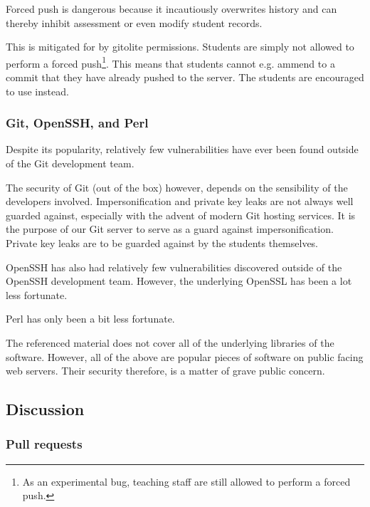 Forced push is dangerous because it incautiously overwrites history and can
thereby inhibit assessment or even modify student records.

This is mitigated for by gitolite permissions. Students are simply not allowed
to perform a forced push\footnote{As an experimental bug, teaching staff are
still allowed to perform a forced push.}. This means that students cannot e.g.
ammend to a commit that they have already pushed to the server. The students
are encouraged to use \cite{man-1-git-revert} instead.

\subsubsection{Git, OpenSSH, and Perl}

Despite its popularity, relatively few vulnerabilities have ever been found
outside of the Git development team\cite{cvedetails-com-2014a}.

The security of Git (out of the box) however, depends on the sensibility of the
developers involved. Impersonification and private key leaks are not always
well guarded against\cite{gerwitz-2013}, especially with the advent of modern
Git hosting services\cite{homakov-2012,huang-2013,homakov-2014}. It is the
purpose of our Git server to serve as a guard against impersonification.
Private key leaks are to be guarded against by the students themselves. 

OpenSSH has also had relatively few vulnerabilities discovered outside of the
OpenSSH development team\cite{cvedetails-com-2014b}. However, the underlying
OpenSSL has been a lot less fortunate\cite{cvedetails-com-2014c}.

Perl has only been a bit less fortunate\cite{cvedetails-com-2014d}.

The referenced material does not cover all of the underlying libraries of the
software. However, all of the above are popular pieces of software on public
facing web servers.  Their security therefore, is a matter of grave public
concern.

\subsection{Discussion}

\subsubsection{Pull requests}

